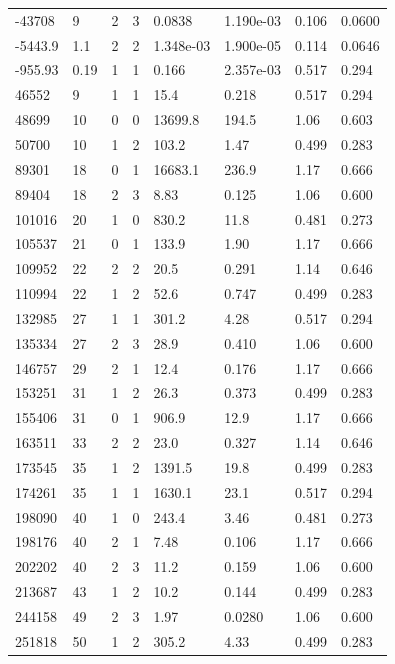 \documentclass[preview]{standalone}
\begin{document}
{{\begin{tabular}{L{1.2cm}C{1.2cm} C{0.3cm}C{0.5cm} C{1.4cm}C{1.4cm} C{1.4cm}C{1.4cm}}
  -43708  &     9  & 2     &  3 &  0.0838  & 1.190e-03  & 0.106 &  0.0600   \\ 
  -5443.9  &   1.1  & 2     &  2 &  1.348e-03  & 1.900e-05  & 0.114 &  0.0646   \\ 
  -955.93  &  0.19  & 1     &  1 &  0.166  & 2.357e-03  & 0.517 &  0.294   \\ 
  46552  &     9  & 1     &  1 &  15.4  & 0.218  & 0.517 &  0.294   \\ 
  48699  &    10  & 0     &  0 &  13699.8  & 194.5  & 1.06 &  0.603   \\ 
  50700  &    10  & 1     &  2 &  103.2  & 1.47  & 0.499 &  0.283   \\ 
  89301  &    18  & 0     &  1 &  16683.1  & 236.9  & 1.17 &  0.666   \\ 
  89404  &    18  & 2     &  3 &  8.83  & 0.125  & 1.06 &  0.600   \\ 
  101016  &    20  & 1     &  0 &  830.2  & 11.8  & 0.481 &  0.273   \\ 
  105537  &    21  & 0     &  1 &  133.9  & 1.90  & 1.17 &  0.666   \\ 
  109952  &    22  & 2     &  2 &  20.5  & 0.291  & 1.14 &  0.646   \\ 
  110994  &    22  & 1     &  2 &  52.6  & 0.747  & 0.499 &  0.283   \\ 
  132985  &    27  & 1     &  1 &  301.2  & 4.28  & 0.517 &  0.294   \\ 
  135334  &    27  & 2     &  3 &  28.9  & 0.410  & 1.06 &  0.600   \\ 
  146757  &    29  & 2     &  1 &  12.4  & 0.176  & 1.17 &  0.666   \\ 
  153251  &    31  & 1     &  2 &  26.3  & 0.373  & 0.499 &  0.283   \\ 
  155406  &    31  & 0     &  1 &  906.9  & 12.9  & 1.17 &  0.666   \\ 
  163511  &    33  & 2     &  2 &  23.0  & 0.327  & 1.14 &  0.646   \\ 
  173545  &    35  & 1     &  2 &  1391.5  & 19.8  & 0.499 &  0.283   \\ 
  174261  &    35  & 1     &  1 &  1630.1  & 23.1  & 0.517 &  0.294   \\ 
  198090  &    40  & 1     &  0 &  243.4  & 3.46  & 0.481 &  0.273   \\ 
  198176  &    40  & 2     &  1 &  7.48  & 0.106  & 1.17 &  0.666   \\ 
  202202  &    40  & 2     &  3 &  11.2  & 0.159  & 1.06 &  0.600   \\ 
  213687  &    43  & 1     &  2 &  10.2  & 0.144  & 0.499 &  0.283   \\ 
  244158  &    49  & 2     &  3 &  1.97  & 0.0280  & 1.06 &  0.600   \\ 
  251818  &    50  & 1     &  2 &  305.2  & 4.33  & 0.499 &  0.283   \\ 
\hline 
\end{tabular} 

}}
\end{document}
